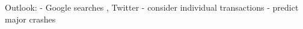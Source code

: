 Outlook:
- Google searches \cite{SocialMedia2015}, Twitter \cite{Twitter2019}
- consider individual transactions \cite{Classification2015}
- predict major crashes \cite{Musk2021} \cite{China2021} \cite{Binance2021}